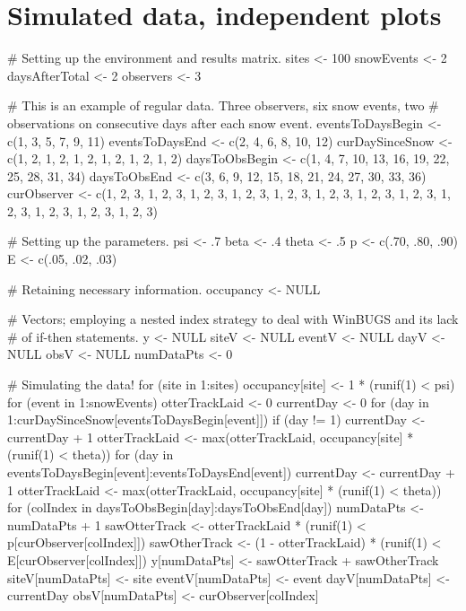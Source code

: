 \documentclass[12pt]{article}
\begin{document}
\section{Simulated data, independent plots}
\scriptsize
\begin{verbatimtab}
# Setting up the environment and results matrix.
sites <- 100
snowEvents <- 2
daysAfterTotal <- 2
observers <- 3

# This is an example of regular data.  Three observers, six snow events, two
# observations on consecutive days after each snow event.
eventsToDaysBegin <- c(1, 3, 5, 7, 9, 11)
eventsToDaysEnd   <- c(2, 4, 6, 8, 10, 12)
curDaySinceSnow <- c(1, 2, 1, 2, 1, 2, 1, 2, 1, 2, 1, 2)
daysToObsBegin <- c(1, 4, 7, 10, 13, 16, 19, 22, 25, 28, 31, 34)
daysToObsEnd   <- c(3, 6, 9, 12, 15, 18, 21, 24, 27, 30, 33, 36)
curObserver <- c(1, 2, 3, 1, 2, 3, 1, 2, 3, 1, 2, 3, 1, 2, 3, 1, 2, 3,
                 1, 2, 3, 1, 2, 3, 1, 2, 3, 1, 2, 3, 1, 2, 3, 1, 2, 3)

# Setting up the parameters.
psi <- .7
beta <- .4
theta <- .5
p <- c(.70, .80, .90)
E <- c(.05, .02, .03)

# Retaining necessary information.
occupancy <- NULL

# Vectors; employing a nested index strategy to deal with WinBUGS and its lack
# of if-then statements.
y <- NULL
siteV <- NULL
eventV <- NULL
dayV <- NULL
obsV <- NULL
numDataPts <- 0

# Simulating the data!
for (site in 1:sites) {
    occupancy[site] <- 1 * (runif(1) < psi)
    for (event in 1:snowEvents) {
        otterTrackLaid <- 0
        currentDay <- 0
        for (day in 1:curDaySinceSnow[eventsToDaysBegin[event]]) {
            if (day != 1) {
                currentDay <- currentDay + 1
                otterTrackLaid <- max(otterTrackLaid,
                    occupancy[site] * (runif(1) < theta))
            }
        }
        for (day in eventsToDaysBegin[event]:eventsToDaysEnd[event]) {
            currentDay <- currentDay + 1
            otterTrackLaid <- max(otterTrackLaid,
                occupancy[site] * (runif(1) < theta))
            for (colIndex in daysToObsBegin[day]:daysToObsEnd[day]) {
                numDataPts <- numDataPts + 1
                sawOtterTrack <- otterTrackLaid *
                    (runif(1) < p[curObserver[colIndex]])
                sawOtherTrack <- (1 - otterTrackLaid) *
                    (runif(1) < E[curObserver[colIndex]])
                y[numDataPts] <- sawOtterTrack + sawOtherTrack
                siteV[numDataPts] <- site
                eventV[numDataPts] <- event
                dayV[numDataPts] <- currentDay
                obsV[numDataPts] <- curObserver[colIndex]
            }
        }
    }
}
\end{verbatimtab}
\end{document}
